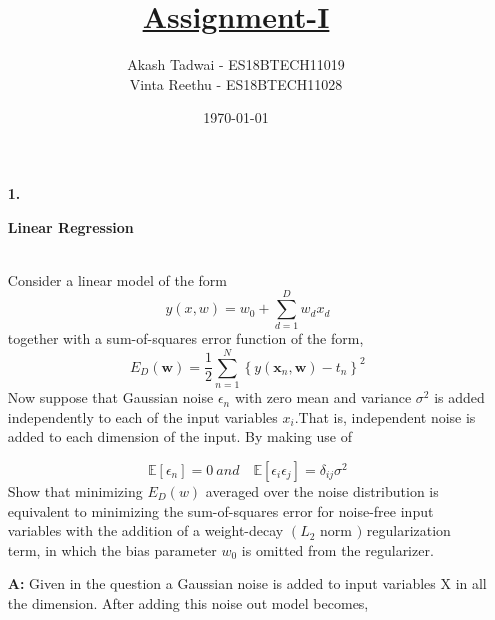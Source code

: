 \documentclass[english,a4paper,12pt]{article}
\title{\textbf{\underline{\Huge{Assignment-I }}}}
\author{Akash Tadwai - ES18BTECH11019 \\ Vinta Reethu - ES18BTECH11028 \\
}
\date{\today}
\begin{document}
\maketitle
\begin{enumerate}
   \item[\textbf{1.}] { \begin{center}
       \large{\textbf{Linear Regression}}  \\~\\
   \end{center}
   Consider a linear model of the form
$$
y(x, w)=w_{0}+\sum_{d=1}^{D} w_{d} x_{d}
$$
together with a sum-of-squares error function of the form,  
$$ E_{D}(\boldsymbol{w})=\frac{1}{2} \sum_{n=1}^{N}\left\{y\left(\boldsymbol{x}_{n}, \boldsymbol{w}\right)-t_{n}\right\}^2 $$
Now suppose that Gaussian noise $\epsilon_{n}$ with zero mean and variance $\sigma^{2}$ is added independently to each of the input variables $x_{i} .$That
is, independent noise is added to each dimension of the input. By making use of

$$
 \mathbb{E}\left[\epsilon_{n}\right]=0 \ and \quad \mathbb{E}\left[\epsilon_{i} \epsilon_{j}\right]=\delta_{ij}\sigma^2
$$
Show that minimizing $E_{D}(w)$ averaged over the noise distribution is equivalent to minimizing the sum-of-squares error for noise-free input variables with the addition of a weight-decay $\left(L_{2}\right.$ norm $)$ regularization term, in which the bias parameter $w_{0}$ is omitted from the regularizer.} \newline

\textbf{A:} 
Given in the question a Gaussian noise is added to input variables X in all the dimension. After adding this noise out model becomes,


\end{enumerate}
\end{document}
